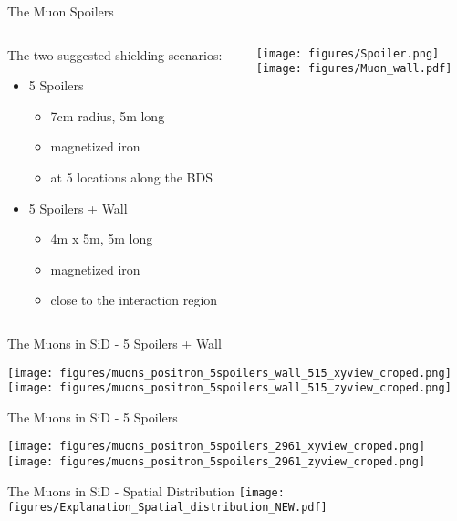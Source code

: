 \documentclass[xcolor={dvipsnames}]{beamer}
\begin{document}
\begin{frame}{The Muon Spoilers}
\begin{columns}
 \begin{column}{0.4\textwidth}
 The two suggested shielding scenarios:
  \begin{itemize}
   \item 5 Spoilers
   \begin{itemize}
    \item 7cm radius, 5m long
    \item magnetized iron
    \item at 5 locations along the BDS
   \end{itemize}
   \item 5 Spoilers + Wall
    \begin{itemize}
    \item 4m x 5m, 5m long
    \item magnetized iron
    \item close to the interaction region
   \end{itemize}
  \end{itemize}

 \end{column}
 \begin{column}{0.6\textwidth}
  \texttt{[image: figures/Spoiler.png]}\\\vspace*{0.3cm}
  \texttt{[image: figures/Muon\_wall.pdf]}
 \end{column}
\end{columns} 
\end{frame}

\begin{frame}{The Muons in SiD - 5 Spoilers + Wall}
\begin{center}
 \texttt{[image: figures/muons\_positron\_5spoilers\_wall\_515\_xyview\_croped.png]}\hspace*{0.1cm}
 \texttt{[image: figures/muons\_positron\_5spoilers\_wall\_515\_zyview\_croped.png]}
\end{center}
 \end{frame}
\begin{frame}{The Muons in SiD - 5 Spoilers}
\begin{center}
   \texttt{[image: figures/muons\_positron\_5spoilers\_2961\_xyview\_croped.png]}\hspace*{0.1cm}
 \texttt{[image: figures/muons\_positron\_5spoilers\_2961\_zyview\_croped.png]}
 \end{center}
\end{frame}
\begin{frame}{The Muons in SiD - Spatial Distribution}
 \texttt{[image: figures/Explanation\_Spatial\_distribution\_NEW.pdf]}
\end{frame}
\end{document}
